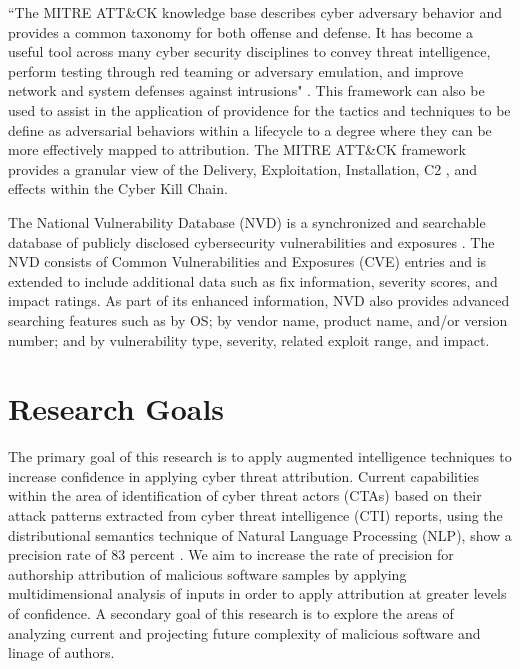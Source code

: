 \documentclass[12pt]{report}
\begin{document}
``The MITRE ATT&CK knowledge base describes cyber adversary behavior and provides a common taxonomy for both offense and defense. It has become a useful tool across many cyber security disciplines to convey threat intelligence, perform testing through red teaming or adversary emulation, and improve network and system defenses against intrusions"  \cite{strom2018mitre}.   This framework can also be used to assist in the application of providence for the tactics and techniques to be define as adversarial behaviors within a lifecycle to a degree where they can be more effectively mapped to attribution.  The MITRE ATT&CK framework provides a granular view of the Delivery, Exploitation, Installation, C2 , and effects within the Cyber Kill Chain. 

The National Vulnerability Database (NVD) is a synchronized and searchable database of publicly disclosed cybersecurity vulnerabilities and exposures \cite{NIST_NVD:2020}.  The NVD consists of Common Vulnerabilities and Exposures (CVE) entries and is extended to include additional data such as fix information, severity scores, and impact ratings. As part of its enhanced information, NVD also provides advanced searching features such as by OS; by vendor name, product name, and/or version number; and by vulnerability type, severity, related exploit range, and impact.


\section{Research Goals}
The primary goal of this research is to apply augmented intelligence techniques to increase confidence in applying cyber threat attribution.  Current capabilities within the area of identification of cyber threat actors (CTAs) based on their attack patterns extracted from cyber threat intelligence (CTI) reports, using the distributional semantics technique of Natural Language Processing (NLP), show a precision rate of 83 percent \cite{noor2019machine}.  We aim to increase the rate of precision for authorship attribution of malicious software samples by applying multidimensional analysis of inputs in order to apply attribution at greater levels of confidence.  A secondary goal of this research is to explore the areas of analyzing current and projecting future complexity of malicious software and linage of authors.  

\end{document}

